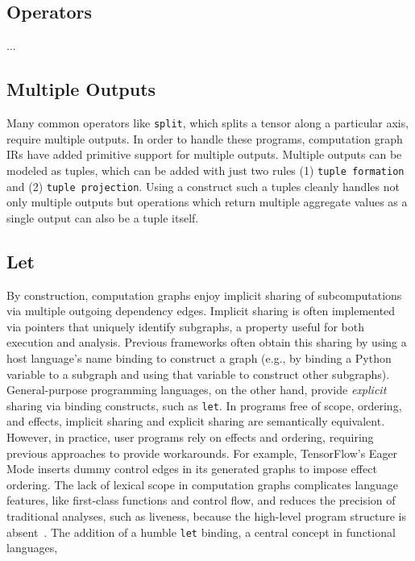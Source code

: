 \subsection{Operators}
...

\subsection*{Multiple Outputs}

Many common operators like \verb|split|, which splits
  a tensor along a particular axis, require multiple outputs.
In order to handle these programs,
  computation graph IRs have added primitive support
  for multiple outputs.
Multiple outputs can be modeled as tuples, which can
  be added with just two rules (1) \verb|tuple formation|
  and (2) \verb|tuple projection|.
Using a construct such a tuples cleanly handles not only multiple
  outputs but operations which return multiple aggregate values
  as a single output can also be a tuple itself.

\subsection*{Let}

By construction, computation graphs enjoy implicit sharing of subcomputations
  via multiple outgoing dependency edges.
Implicit sharing is often implemented via pointers that uniquely identify subgraphs,
  a property useful for both execution and analysis.
Previous frameworks often obtain this sharing by using a host
  language's name binding to construct a graph (e.g., by binding a Python variable
  to a subgraph and using that variable to construct other subgraphs).
General-purpose programming languages, on the other hand, provide \textit{explicit}
  sharing via binding constructs, such as \verb|let|.
In programs free of scope, ordering, and effects, implicit sharing
  and explicit sharing are semantically equivalent.
However, in practice, user programs rely on effects and ordering,
  requiring previous approaches to provide workarounds.
For example, TensorFlow's Eager Mode inserts dummy control edges
  in its generated graphs to impose effect ordering.
The lack of lexical scope in computation graphs complicates language features,
  like first-class functions and control flow,
  and reduces the precision of traditional analyses,
  such as liveness,
  because the high-level program structure is absent~\citep{funarg, funarg_sol}.
The addition of a humble \verb|let| binding, a central concept in functional languages,

